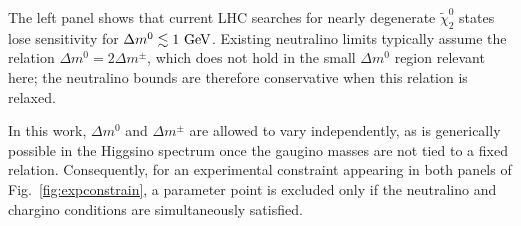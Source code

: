 \documentclass[
    prl,
    twocolumn,
    superscriptaddress,
    nofootinbib,
    amsmath, amssymb,
    aps,
    reprint,
    floatfix
]{revtex4-2}
\newcommand{\Shufang}[1]{\textcolor{red} {SS: #1}}
\newcommand{\px}[1]{\textcolor{blue} {PX: {\bf Comment:} {\it #1}}}
\begin{document}
% 
The left panel shows that current LHC searches for nearly degenerate $\tilde{\chi}^0_2$ states lose sensitivity for $\Delta m^0 \lesssim 1~\rm{GeV}$. 
Existing neutralino limits typically assume the relation $\Delta m^0 = 2 \Delta m^\pm$, which does not hold in the small $\Delta m^0$ region relevant here; the neutralino bounds are therefore conservative when this relation is relaxed. 

In this work, $\Delta m^0$ and $\Delta m^\pm$ are allowed to vary independently, as is generically possible in the Higgsino spectrum once the gaugino masses are not tied to a fixed relation.
Consequently, for an experimental constraint appearing in both panels of Fig.~\ref{fig:expconstrain}, a parameter point is excluded only 
if the neutralino and chargino conditions are simultaneously satisfied. 



% 
\end{document}
